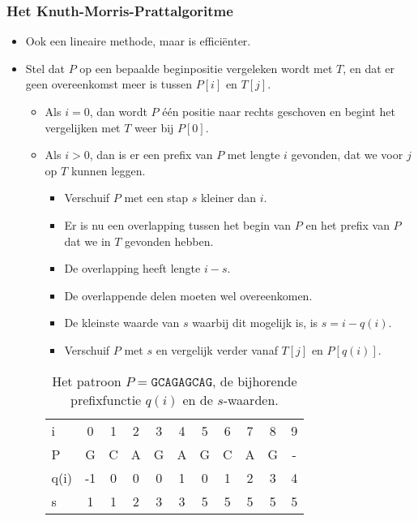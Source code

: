 \subsubsection{Het Knuth-Morris-Prattalgoritme}
\begin{itemize}
    \item Ook een lineaire methode, maar is efficiënter.
    \item Stel dat $P$ op een bepaalde beginpositie vergeleken wordt met $T$, en dat er geen overeenkomst meer is tussen $P[i]$ en $T[j]$.
    \begin{itemize}
        \item Als $i = 0$, dan wordt $P$ één positie naar rechts geschoven en begint het vergelijken met $T$ weer bij $P[0]$.
        \item Als $i > 0$, dan is er een prefix van $P$ met lengte $i$ gevonden, dat we voor $j$ op $T$ kunnen leggen.
        \begin{itemize}
            \item Verschuif $P$ met een stap $s$ kleiner dan $i$.
            \item Er is nu een overlapping tussen het begin van $P$ en het prefix van $P$ dat we in $T$ gevonden hebben.
            \item De overlapping heeft lengte $i - s$.
            \item De overlappende delen moeten wel overeenkomen.
            \item De kleinste waarde van $s$ waarbij dit mogelijk is, is $s = i - q(i)$.
            \item Verschuif $P$ met $s$ en vergelijk verder vanaf $T[j]$ en $P[q(i)]$.
        \end{itemize}
        \begin{table}[ht]
            \centering
            \begin{tabular}{l | c c c c c c c c c c}
                i   & 0 & 1 & 2 & 3 & 4 & 5 & 6 & 7 & 8 & 9\\
                P   & G & C & A & G & A & G & C & A & G & - \\
                    \hline
                q(i) & -1 & 0 & 0 & 0 & 1 & 0 & 1 & 2 & 3 & 4 \\
                s   & 1 & 1 & 2 & 3 & 3 & 5 & 5 & 5 & 5 & 5
            \end{tabular}
            \caption{Het patroon $P = \texttt{GCAGAGCAG}$, de bijhorende prefixfunctie $q(i)$ en de $s$-waarden.}
            \label{table:kmp1}
        \end{table}


\end{itemize}
\end{itemize}
